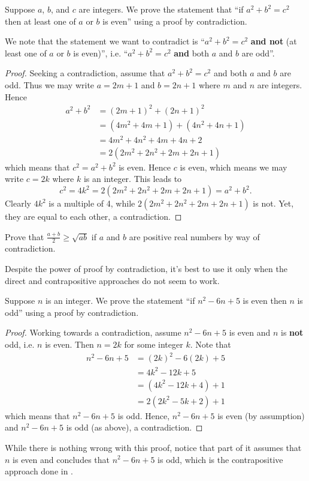 \begin{example}
    Suppose $a$, $b$, and $c$ are integers. We prove the statement that ``if $a^2 + b^2 = c^2$ then at least one of $a$ or $b$ is even'' using a proof by contradiction.
    
    We note that the statement we want to contradict is ``$a^2 + b^2 = c^2$ \textbf{and not} (at least one of $a$ or $b$ is even)'', i.e. ``$a^2 + b^2 = c^2$ \textbf{and} both $a$ and $b$ are odd''.
    \begin{proof}
        Seeking a contradiction, assume that $a^2 + b^2 = c^2$ and both $a$ and $b$ are odd. Thus we may write $a = 2m + 1$ and $b = 2n + 1$ where $m$ and $n$ are integers. Hence
        \begin{align*}
            a^2 + b^2 &= (2m+1)^2 + (2n+1)^2\\
            &= (4m^2+4m+1) + (4n^2+4n+1)\\
            &= 4m^2 + 4n^2 + 4m + 4n + 2\\
            &= 2(2m^2 + 2n^2 + 2m + 2n +1)
        \end{align*}
        which means that $c^2 = a^2 + b^2$ is even. Hence $c$ is even, which means we may write $c = 2k$ where $k$ is an integer. This leads to
        \[
            c^2 = 4k^2 = 2(2m^2 + 2n^2 + 2m + 2n + 1) = a^2 + b^2.
        \]
        Clearly $4k^2$ is a multiple of 4, while $2(2m^2 + 2n^2 + 2m + 2n + 1)$ is not. Yet, they are equal to each other, a contradiction.
    \end{proof}
\end{example}

\begin{exercise}
    Prove that $\frac{a+b}{2} \geq \sqrt{ab}$ if $a$ and $b$ are positive real numbers by way of contradiction.
\end{exercise}

Despite the power of proof by contradiction, it's best to use it only when the direct and contrapositive approaches do not seem to work.
\begin{example}
    Suppose $n$ is an integer. We prove the statement ``if $n^2 - 6n + 5$ is even then $n$ is odd'' using a proof by contradiction.
    \begin{proof}
        Working towards a contradiction, assume $n^2 - 6n + 5$ is even and $n$ is \textbf{not} odd, i.e. $n$ is even. Then $n = 2k$ for some integer $k$. Note that
        \begin{align*}
            n^2 - 6n + 5 &= (2k)^2 - 6(2k) + 5\\
            &= 4k^2 - 12k + 5\\
            &= (4k^2 - 12k + 4) + 1\\
            &= 2(2k^2 - 5k + 2) + 1
        \end{align*}
        which means that $n^2 - 6n + 5$ is odd. Hence, $n^2 - 6n + 5$ is even (by assumption) and $n^2 - 6n + 5$ is odd (as above), a contradiction.
    \end{proof}
    While there is nothing wrong with this proof, notice that part of it assumes that $n$ is even and concludes that  $n^2 - 6n + 5$ is odd, which is the contrapositive approach done in .
\end{example}

